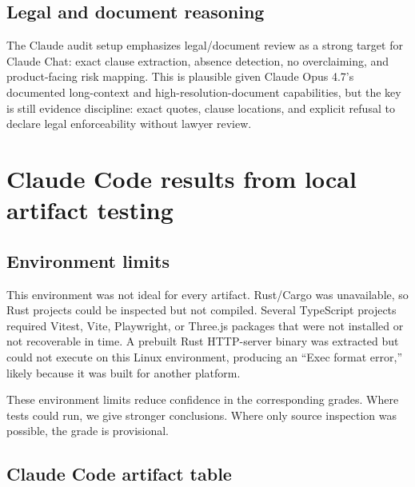 \documentclass[11pt]{article}
\begin{document}
\subsection{Legal and document reasoning}

The Claude audit setup emphasizes legal/document review as a strong target for Claude Chat: exact clause extraction, absence detection, no overclaiming, and product-facing risk mapping. This is plausible given Claude Opus 4.7's documented long-context and high-resolution-document capabilities, but the key is still evidence discipline: exact quotes, clause locations, and explicit refusal to declare legal enforceability without lawyer review.

\section{Claude Code results from local artifact testing}

\subsection{Environment limits}

This environment was not ideal for every artifact. Rust/Cargo was unavailable, so Rust projects could be inspected but not compiled. Several TypeScript projects required Vitest, Vite, Playwright, or Three.js packages that were not installed or not recoverable in time. A prebuilt Rust HTTP-server binary was extracted but could not execute on this Linux environment, producing an ``Exec format error,'' likely because it was built for another platform.

These environment limits reduce confidence in the corresponding grades. Where tests could run, we give stronger conclusions. Where only source inspection was possible, the grade is provisional.

\subsection{Claude Code artifact table}
\end{document}
